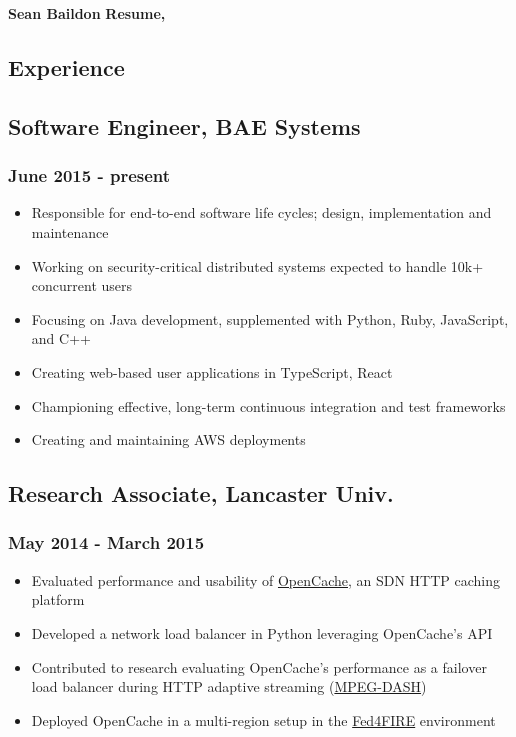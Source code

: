 \documentclass[a4paper,11pt]{article}
\begin{document}
\large
\noindent\textbf{Sean Baildon}
\hfill
\noindent\textbf{Resume, \the\year}
\normalsize

\vspace{2ex}
\hrulefill{}
\vspace{1ex}

\begin{multicols*}{2}

\section*{Experience}
\subsection*{Software Engineer, BAE Systems}
\subsubsection*{June 2015 - present}
\begin{itemize}[leftmargin=*]
	\item Responsible for end-to-end software life cycles; design, implementation and maintenance
	\item Working on security-critical distributed systems expected to handle 10k+ concurrent users
	\item Focusing on Java development, supplemented with Python, Ruby, JavaScript, and C++
	\item Creating web-based user applications in TypeScript, React
	\item Championing effective, long-term continuous integration and test frameworks
	\item Creating and maintaining AWS deployments
\end{itemize}

\subsection*{Research Associate, Lancaster Univ.}
\subsubsection*{May 2014 - March 2015}
\begin{itemize}[leftmargin=*]
	\item Evaluated performance and usability of \href{https://github.com/broadbent/opencache}{OpenCache}, an SDN HTTP caching platform
	\item Developed a network load balancer in Python leveraging OpenCache's API
	\item Contributed to research evaluating OpenCache's performance as a failover load balancer during HTTP adaptive streaming (\href{https://en.wikipedia.org/wiki/Dynamic_Adaptive_Streaming_over_HTTP}{MPEG-DASH})
	\item Deployed OpenCache in a multi-region setup in the \href{https://www.fed4fire.eu}{Fed4FIRE} environment
\end{itemize}


\end{multicols*}
\end{document}
